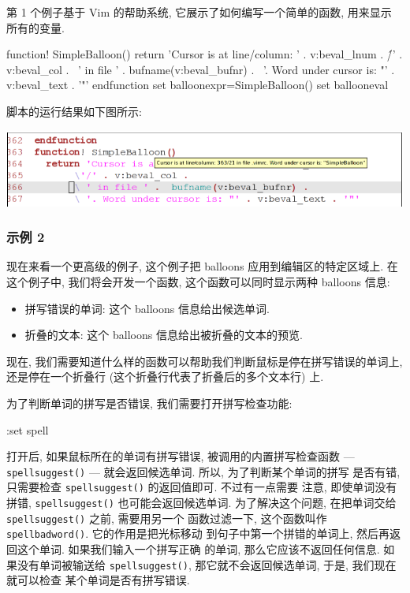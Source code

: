 第 1 个例子基于 Vim 的帮助系统, 它展示了如何编写一个简单的函数, 用来显示
所有的变量.
\begin{vimscript}
function! SimpleBalloon()
   return 'Cursor is at line/column: ' . v:beval_lnum .
		\'/' . v:beval_col .
		\ ' in file ' .  bufname(v:beval_bufnr) .
		\ '. Word under cursor is: "' . v:beval_text . '"'
endfunction
set balloonexpr=SimpleBalloon()
set ballooneval
\end{vimscript}
脚本的运行结果如下图所示:
\begin{center}
    \includegraphics[scale=0.5]{./images/page44.png}
\end{center}

\subsubsection{示例 2}
\label{subsubsec:example_2}

现在来看一个更高级的例子, 这个例子把 balloons 应用到编辑区的特定区域上.
在这个例子中, 我们将会开发一个函数, 这个函数可以同时显示两种 balloons 
信息:
\begin{itemize}
    \item 拼写错误的单词: 这个 balloons 信息给出候选单词.
    \item 折叠的文本: 这个 balloons 信息给出被折叠的文本的预览.
\end{itemize}

现在, 我们需要知道什么样的函数可以帮助我们判断鼠标是停在拼写错误的单词上,
还是停在一个折叠行 (这个折叠行代表了折叠后的多个文本行) 上.

为了判断单词的拼写是否错误, 我们需要打开拼写检查功能:
\begin{vimcmd}
:set spell
\end{vimcmd}
打开后, 如果鼠标所在的单词有拼写错误, 被调用的内置拼写检查函数 ---
\texttt{spellsuggest()} --- 就会返回候选单词. 所以, 为了判断某个单词的拼写
是否有错, 只需要检查 \texttt{spellsuggest()} 的返回值即可. 不过有一点需要
注意, 即使单词没有拼错, \texttt{spellsuggest()} 也可能会返回候选单词.
为了解决这个问题, 在把单词交给 \texttt{spellsuggest()} 之前, 需要用另一个
函数过滤一下, 这个函数叫作 \texttt{spellbadword()}. 它的作用是把光标移动
到句子中第一个拼错的单词上, 然后再返回这个单词. 如果我们输入一个拼写正确
的单词, 那么它应该不返回任何信息. 如果没有单词被输送给
\texttt{spellsuggest()}, 那它就不会返回候选单词, 于是, 我们现在就可以检查
某个单词是否有拼写错误.

